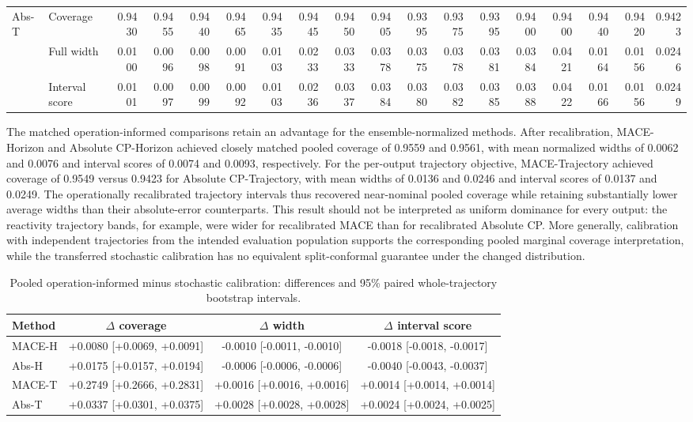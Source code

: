\begin{table}[!htbp]
{\begin{tabular}{@{}ll*{16}{r}@{}}
\midrule
\multirow{3}{*}{Abs-T}
& Coverage
& 0.9430 & 0.9455 & 0.9440 & 0.9465 & 0.9435
& 0.9445 & 0.9450 & 0.9405 & 0.9395 & 0.9375 & 0.9395
& 0.9400 & 0.9400 & 0.9440 & 0.9420 & 0.9423 \\
& Full width
& 0.0100 & 0.0096 & 0.0098 & 0.0091 & 0.0103
& 0.0233 & 0.0333 & 0.0378 & 0.0375 & 0.0378 & 0.0381
& 0.0384 & 0.0421 & 0.0164 & 0.0156 & 0.0246 \\
& Interval score
& 0.0101 & 0.0097 & 0.0099 & 0.0092 & 0.0103
& 0.0236 & 0.0337 & 0.0384 & 0.0380 & 0.0382 & 0.0385
& 0.0388 & 0.0422 & 0.0166 & 0.0156 & 0.0249 \\
\bottomrule
\end{tabular}%
}
\end{table}

The matched operation-informed comparisons retain an advantage for the ensemble-normalized methods. After recalibration, MACE-Horizon and Absolute CP-Horizon achieved closely matched pooled coverage of 0.9559 and 0.9561, with mean normalized widths of 0.0062 and 0.0076 and interval scores of 0.0074 and 0.0093, respectively. For the per-output trajectory objective, MACE-Trajectory achieved coverage of 0.9549 versus 0.9423 for Absolute CP-Trajectory, with mean widths of 0.0136 and 0.0246 and interval scores of 0.0137 and 0.0249. The operationally recalibrated trajectory intervals thus recovered near-nominal pooled coverage while retaining substantially lower average widths than their absolute-error counterparts. This result should not be interpreted as uniform dominance for every output: the reactivity trajectory bands, for example, were wider for recalibrated MACE than for recalibrated Absolute CP. More generally, calibration with independent trajectories from the intended evaluation population supports the corresponding pooled marginal coverage interpretation, while the transferred stochastic calibration has no equivalent split-conformal guarantee under the changed distribution.

\begin{table}[!htbp]
\centering
\footnotesize
\setlength{\tabcolsep}{4.5pt}
\renewcommand{\arraystretch}{1.08}
\captionsetup{skip=3pt}
\caption{Pooled operation-informed minus stochastic calibration: differences and 95\% paired whole-trajectory bootstrap intervals.}
\label{tab:mace_operational_paired}
\begin{tabular}{@{}lccc@{}}
\toprule
Method & $\Delta$ coverage & $\Delta$ width & $\Delta$ interval score  \\
\midrule
MACE-H & +0.0080 [+0.0069, +0.0091] & -0.0010 [-0.0011, -0.0010] & -0.0018 [-0.0018, -0.0017] \\
Abs-H & +0.0175 [+0.0157, +0.0194] & -0.0006 [-0.0006, -0.0006] & -0.0040 [-0.0043, -0.0037] \\
MACE-T & +0.2749 [+0.2666, +0.2831] & +0.0016 [+0.0016, +0.0016] & +0.0014 [+0.0014, +0.0014] \\
Abs-T & +0.0337 [+0.0301, +0.0375] & +0.0028 [+0.0028, +0.0028] & +0.0024 [+0.0024, +0.0025] \\
\bottomrule
\end{tabular}
\end{table}

